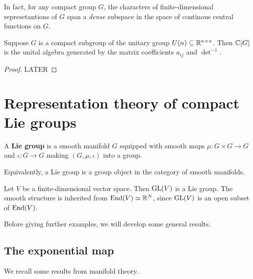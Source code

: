 \documentclass[11pt, english]{article}
\begin{document}
In fact, for any compact group $G$, the characters of finite-dimensional represetantions of $G$ span a \emph{dense} subspace in the space of continous central functions on $G$. 

\begin{thm}
  Suppose $G$ is a compact subgroup of the unitary group $U(n) \subseteq \mathbb{R}^{n\times n}$. Then $\mathbb{C}[G]$ is the unital algebra generated by the matrix coefficients $a_{ij}$ and $\det^{-1}$. 
\end{thm}

\begin{proof}
  LATER
\end{proof}


\section{Representation theory of compact Lie groups}

A \textbf{Lie group} is a smooth manifold $G$ equipped with smooth maps $\mu:G \times G \to G$ and $\iota:G \to G$ making $(G,\mu,\iota)$ into a group.

Equivalently, a Lie group is a group object in the category of smooth manifolds.

\begin{example}
 Let $V$ be a finite-dimensional vector space. Then $\operatorname{GL}(V)$ is a Lie group. The smooth structure is inherited from $\operatorname{End}(V) \simeq \mathbb{R}^N$, since $\operatorname{GL}(V)$ is an open subset of $\operatorname{End}(V)$.
\end{example}

Before giving further examples, we will develop some general results.

\subsection{The exponential map}

We recall some results from manifold theory.
\end{document}
